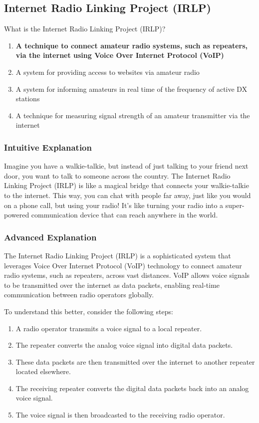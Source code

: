 \subsection{Internet Radio Linking Project (IRLP)}
\label{T8C08}

\begin{tcolorbox}[colback=gray!10!white,colframe=black!75!black,title=T8C08]
What is the Internet Radio Linking Project (IRLP)?
\begin{enumerate}[label=\Alph*)]
    \item \textbf{A technique to connect amateur radio systems, such as repeaters, via the internet using Voice Over Internet Protocol (VoIP)}
    \item A system for providing access to websites via amateur radio
    \item A system for informing amateurs in real time of the frequency of active DX stations
    \item A technique for measuring signal strength of an amateur transmitter via the internet
\end{enumerate}
\end{tcolorbox}

\subsubsection{Intuitive Explanation}
Imagine you have a walkie-talkie, but instead of just talking to your friend next door, you want to talk to someone across the country. The Internet Radio Linking Project (IRLP) is like a magical bridge that connects your walkie-talkie to the internet. This way, you can chat with people far away, just like you would on a phone call, but using your radio! It’s like turning your radio into a super-powered communication device that can reach anywhere in the world.

\subsubsection{Advanced Explanation}
The Internet Radio Linking Project (IRLP) is a sophisticated system that leverages Voice Over Internet Protocol (VoIP) technology to connect amateur radio systems, such as repeaters, across vast distances. VoIP allows voice signals to be transmitted over the internet as data packets, enabling real-time communication between radio operators globally. 

To understand this better, consider the following steps:
\begin{enumerate}
    \item A radio operator transmits a voice signal to a local repeater.
    \item The repeater converts the analog voice signal into digital data packets.
    \item These data packets are then transmitted over the internet to another repeater located elsewhere.
    \item The receiving repeater converts the digital data packets back into an analog voice signal.
    \item The voice signal is then broadcasted to the receiving radio operator.
\end{enumerate}

